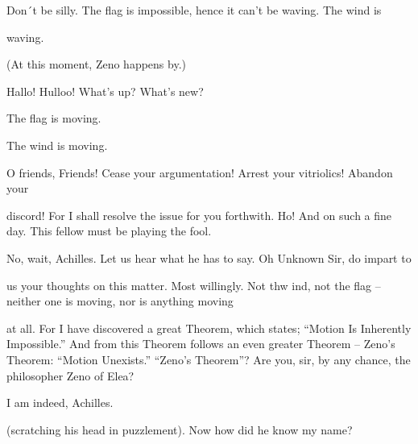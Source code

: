 \tortoise Don´t be silly. The flag is impossible, hence it can’t be waving. The wind is\par
waving. 


\intro (At this moment, Zeno happens by.) \endintro



\zeno Hallo! Hulloo! What’s up? What’s new?\par

\achilles The flag is moving.\par

\tortoise The wind is moving.\par

\zeno O friends, Friends! Cease your argumentation! Arrest your vitriolics! Abandon your\par
discord! For I shall resolve the issue for you forthwith. Ho! And on such a fine day. 
\achilles This fellow must be playing the fool.\par

\tortoise No, wait, Achilles. Let us hear what he has to say. Oh Unknown Sir, do impart to\par
us your thoughts on this matter. 
\zeno Most willingly. Not thw ind, not the flag – neither one is moving, nor is anything moving\par
at all. For I have discovered a great Theorem, which states; “Motion Is Inherently Impossible.” And from this Theorem follows an even greater Theorem – Zeno’s Theorem: “Motion Unexists.” 
\achilles “Zeno’s Theorem”? Are you, sir, by any chance, the philosopher Zeno of Elea?\par

\zeno I am indeed, Achilles.\par

\achilles (scratching his head in puzzlement). Now how did he know my name?\par

